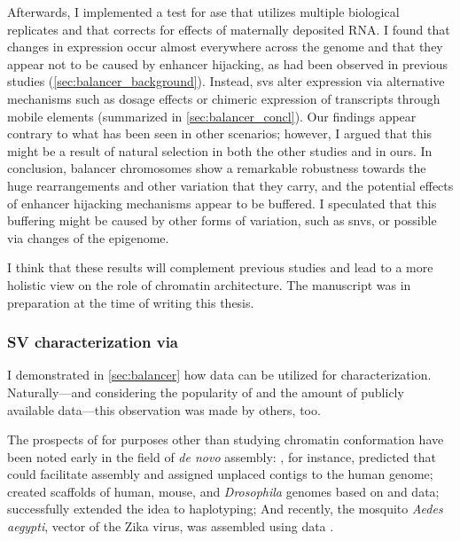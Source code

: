 Afterwards, I implemented a
test for \acl{ase} that utilizes multiple biological replicates and that
corrects for effects of maternally deposited RNA. I found that changes in
expression occur almost everywhere across the genome and that they appear not to
be caused by enhancer hijacking, as had been observed in previous studies (\cref{sec:balancer_background}).
Instead, \acp{sv} alter expression via alternative mechanisms such as dosage
effects or chimeric expression of transcripts through mobile elements (summarized in \cref{sec:balancer_concl}). Our
findings appear contrary to what has been seen in other scenarios; however, I
argued that this might be a result of natural selection in both the other
studies and in ours. In conclusion, balancer chromosomes show a remarkable
robustness towards the huge rearrangements and other variation that they carry,
and the potential effects of enhancer hijacking mechanisms appear to be buffered.
I speculated that this buffering might be caused by other forms of variation,
such as \acp{snv}, or possible via changes of the epigenome.

I think that these results will complement
previous studies and lead to a more holistic view on the role of chromatin
architecture. The manuscript was in preparation at the time of writing this
thesis.





\subsubsection{SV characterization via \hic}
I demonstrated in \cref{sec:balancer} how \hic data can be utilized for \sv
characterization. Naturally---and considering the popularity of \hic and the
amount of publicly available data---this observation was made by others, too.

The prospects of \hic for purposes other than studying chromatin conformation have
been noted early in the field of \textit{de novo} assembly:
, for instance, predicted that \hic could facilitate assembly
and assigned unplaced contigs to the human genome;  created
scaffolds of human, mouse, and \textit{Drosophila} genomes based on \hic and
\mps data;  successfully extended the idea to haplotyping;
And recently, the mosquito \textit{Aedes aegypti}, vector of the Zika virus, was
assembled using \hic data \citep{Dudchenko2017}.

